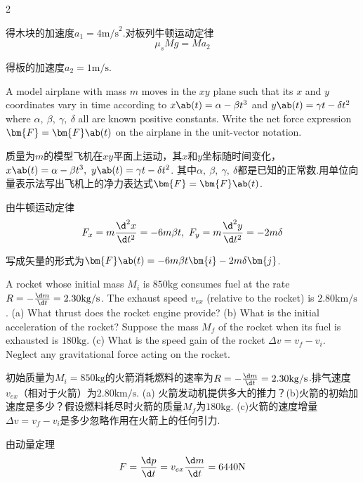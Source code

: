 \begin{multicols}{2}
{\begin{solution}
    得木块的加速度$a_1=4\mathrm{m/s}^2$.对板列牛顿运动定律
    $$\mu_sMg=Ma_2$$
    
    得板的加速度$a_2=1\mathrm{m/s}$.
\end{solution}

\begin{problem}
    A model airplane with mass $m$ moves in the $xy$ plane such that its $x$ and $y$ coordinates vary in time according to $x\ab(t)=\alpha-\beta t^3$ and $y\ab(t)=\gamma t-\delta t^2$ where $\alpha,\ \beta,\ \gamma,\ \delta$ all are known positive constants. Write the net force expression $\bm{F}=\bm{F}\ab(t)$ on the airplane in the unit-vector notation.
\end{problem}
\begin{translation}
    质量为$m$的模型飞机在$xy$平面上运动，其$x$和$y$坐标随时间变化，$x\ab(t)=\alpha-\beta t^3,\ y\ab(t)=\gamma t-\delta t^2$. 其中$\alpha,\ \beta,\ \gamma,\ \delta$都是已知的正常数.用单位向量表示法写出飞机上的净力表达式$\bm{F}=\bm{F}\ab(t)$.
\end{translation}
\begin{solution}
    由牛顿运动定律
    $$F_x=m\frac{\d^2x}{\d t^2}=-6m\beta t,\  F_y=m\frac{\d^2y}{\d t^2}=-2m\delta$$

    写成矢量的形式为$\bm{F}\ab(t)=-6m\beta t\bm{i}-2m\delta\bm{j}$.
\end{solution}

\begin{problem}
    A rocket whose initial mass $M_i$ is $850\mathrm{kg}$ consumes fuel at the rate $R=-\frac{\d m}{\d t}=2.30\mathrm{kg/s}$. The exhaust speed $v_{ex}$ (relative to the rocket) is $2.80\mathrm{km/s}$. (a) What thrust does the rocket engine provide? (b) What is the initial acceleration of the rocket? Suppose the mass $M_f$ of the rocket when its fuel is exhausted is $180\mathrm{kg}$. (c) What is the speed gain of the rocket $\Delta v=v_f-v_i$. Neglect any gravitational force acting on the rocket.
\end{problem}
\begin{translation}
    初始质量为$M_i=850\mathrm{kg}$的火箭消耗燃料的速率为$R=-\frac{\d m}{\d t}=2.30\mathrm{kg/s}$.排气速度$v_{ex}$（相对于火箭）为$2.80\mathrm{km/s}$. (a) 火箭发动机提供多大的推力？(b)火箭的初始加速度是多少？假设燃料耗尽时火箭的质量$M_f$为$180\mathrm{kg}$. (c)火箭的速度增量$\Delta v=v_f-v_i$是多少忽略作用在火箭上的任何引力.
\end{translation}
\begin{solution}
    由动量定理
    $$F=\frac{\d p}{\d t}=v_{ex}\frac{\d m}{\d t}=6440\mathrm{N}$$


\end{solution}}
\end{multicols}
